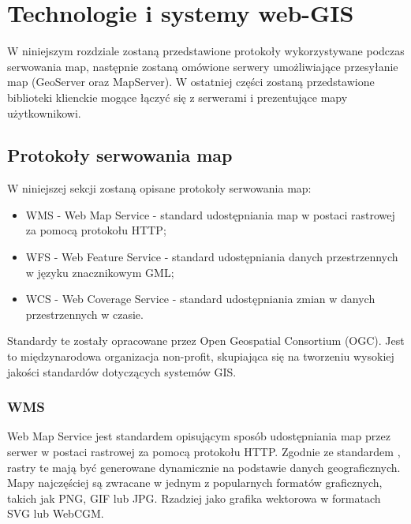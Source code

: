 \chapter{Technologie i systemy web-GIS}
W niniejszym rozdziale zostaną przedstawione protokoły wykorzystywane podczas serwowania map, następnie zostaną omówione serwery umożliwiające przesyłanie map (GeoServer oraz MapServer).
W ostatniej części zostaną przedstawione biblioteki klienckie mogące łączyć się z serwerami i prezentujące mapy użytkownikowi.

\section{Protokoły serwowania map}
\label{chap:protokoly}

W niniejszej sekcji zostaną opisane protokoły serwowania map:
\begin{itemize}
\item WMS - Web Map Service - standard udostępniania map w postaci rastrowej za pomocą protokołu HTTP;
\item WFS - Web Feature Service - standard udostępniania danych przestrzennych w języku znacznikowym GML;
\item WCS - Web Coverage Service - standard udostępniania zmian w danych przestrzennych w czasie.
\end{itemize}

Standardy te zostały opracowane przez Open Geospatial Consortium (OGC). Jest to międzynarodowa organizacja non-profit, skupiająca się na tworzeniu wysokiej jakości standardów dotyczących systemów GIS.

\subsection{WMS}
Web Map Service jest standardem opisującym sposób udostępniania map przez serwer w postaci rastrowej za pomocą protokołu HTTP.
Zgodnie ze standardem \cite{OpenGIS_WMS2006}, rastry te mają być generowane dynamicznie na podstawie danych geograficznych.
Mapy najczęściej są zwracane w jednym z popularnych formatów graficznych, takich jak PNG, GIF lub JPG. Rzadziej jako grafika wektorowa w formatach SVG lub WebCGM.

